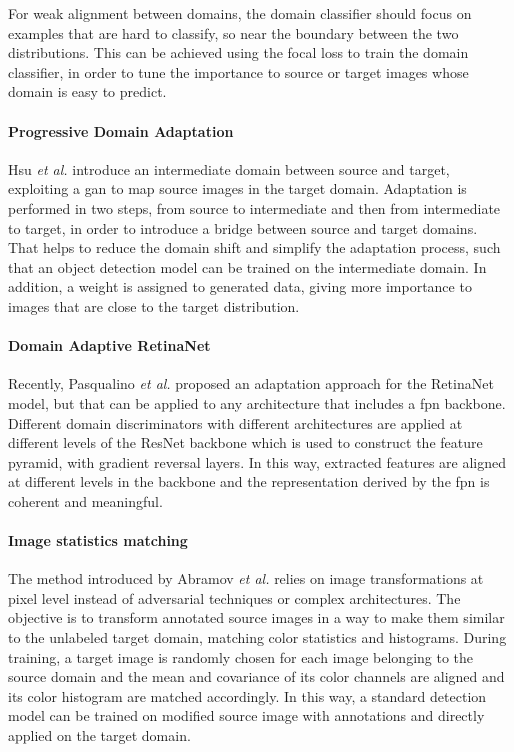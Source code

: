 \documentclass[%
    corpo=12pt,
    twoside,
    stile=classica,   
    tipotesi=magistrale,
    evenboxes,
    english
]{toptesi}
\begin{document}
For weak alignment between domains, the domain classifier should focus on examples that are hard to classify, so near the boundary between the two distributions. This can be achieved using the focal loss to train the domain classifier, in order to tune the importance to source or target images whose domain is easy to predict.

\paragraph{Progressive Domain Adaptation}
Hsu \emph{et al.}\cite{hsu2019progressive} introduce an intermediate domain between source and target, exploiting a \gls{gan} to map source images in the target domain. Adaptation is performed in two steps, from source to intermediate and then from intermediate to target, in order to introduce a bridge between source and target domains. That helps to reduce the domain shift and simplify the adaptation process, such that an object detection model can be trained on the intermediate domain. In addition, a weight is assigned to generated data, giving more importance to images that are close to the target distribution.

\paragraph{Domain Adaptive RetinaNet}\label{sec:daretinanet}
Recently, Pasqualino \emph{et al.}\cite{pasqualino2020unsupervised} proposed an adaptation approach for the RetinaNet model, but that can be applied to any architecture that includes a \gls{fpn} backbone. Different domain discriminators with different architectures are applied at different levels of the ResNet backbone which is used to construct the feature pyramid, with gradient reversal layers. In this way, extracted features are aligned at different levels in the backbone and the representation derived by the \gls{fpn} is coherent and meaningful.

\paragraph{Image statistics matching}\label{sec:kis}
The method introduced by Abramov \emph{et al.}\cite{abramov2020simple} relies on image transformations at pixel level instead of adversarial techniques or complex architectures. The objective is to transform annotated source images in a way to make them similar to the unlabeled target domain, matching color statistics and histograms. During training, a target image is randomly chosen for each image belonging to the source domain and the mean and covariance of its color channels are aligned and its color histogram are matched accordingly. In this way, a standard detection model can be trained on modified source image with annotations and directly applied on the target domain.
\end{document}
